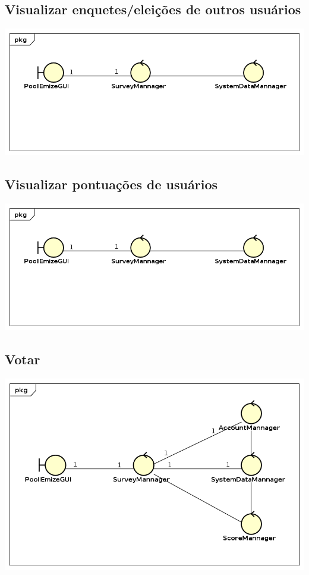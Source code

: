 \documentclass[a4paper,12pt]{report}
\begin{document}
\subsection*{Visualizar enquetes/eleições de outros usuários}
\markright{}
\includegraphics[width=14.3cm]{class_diagrams/VCPVisualizarEnquetes.png}

\subsection*{Visualizar pontuações de usuários}
\markright{}
\includegraphics[width=14.3cm]{class_diagrams/VCPVisualizarEnquetes.png}

\subsection*{Votar}
\markright{}
\includegraphics[width=14.3cm]{class_diagrams/VCPVotar.png}
\end{document}
